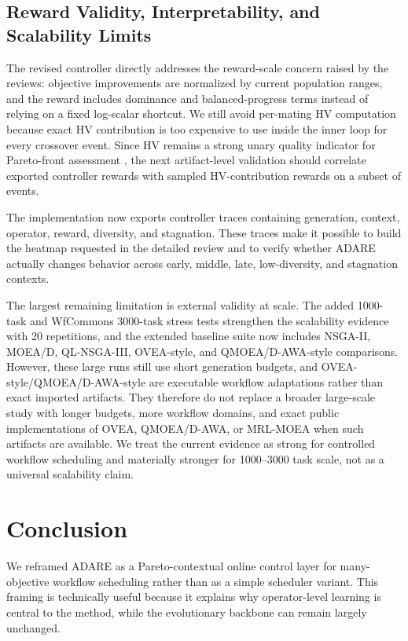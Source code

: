 \documentclass[runningheads]{llncs}
\begin{document}
\subsection{Reward Validity, Interpretability, and Scalability Limits}
The revised controller directly addresses the reward-scale concern raised by the reviews: objective improvements are normalized by current population ranges, and the reward includes dominance and balanced-progress terms instead of relying on a fixed log-scalar shortcut. We still avoid per-mating HV computation because exact HV contribution is too expensive to use inside the inner loop for every crossover event. Since HV remains a strong unary quality indicator for Pareto-front assessment \cite{zitzler2003performance}, the next artifact-level validation should correlate exported controller rewards with sampled HV-contribution rewards on a subset of events.

The implementation now exports controller traces containing generation, context, operator, reward, diversity, and stagnation. These traces make it possible to build the heatmap requested in the detailed review and to verify whether ADARE actually changes behavior across early, middle, late, low-diversity, and stagnation contexts.

The largest remaining limitation is external validity at scale. The added 1000-task and WfCommons 3000-task stress tests strengthen the scalability evidence with 20 repetitions, and the extended baseline suite now includes NSGA-II, MOEA/D, QL-NSGA-III, OVEA-style, and QMOEA/D-AWA-style comparisons. However, these large runs still use short generation budgets, and OVEA-style/QMOEA/D-AWA-style are executable workflow adaptations rather than exact imported artifacts. They therefore do not replace a broader large-scale study with longer budgets, more workflow domains, and exact public implementations of OVEA, QMOEA/D-AWA, or MRL-MOEA when such artifacts are available. We treat the current evidence as strong for controlled workflow scheduling and materially stronger for 1000--3000 task scale, not as a universal scalability claim.
\section{Conclusion}
We reframed ADARE as a Pareto-contextual online control layer for many-objective workflow scheduling rather than as a simple scheduler variant. This framing is technically useful because it explains why operator-level learning is central to the method, while the evolutionary backbone can remain largely unchanged.
\end{document}
